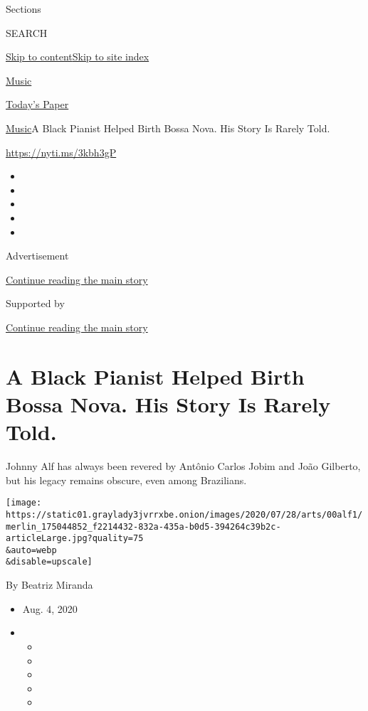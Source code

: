 Sections

SEARCH

\protect\hyperlink{site-content}{Skip to
content}\protect\hyperlink{site-index}{Skip to site index}

\href{https://www.nytimes3xbfgragh.onion/section/arts/music}{Music}

\href{https://myaccount.nytimes3xbfgragh.onion/auth/login?response_type=cookie\&client_id=vi}{}

\href{https://www.nytimes3xbfgragh.onion/section/todayspaper}{Today's
Paper}

\href{/section/arts/music}{Music}\textbar{}A Black Pianist Helped Birth
Bossa Nova. His Story Is Rarely Told.

\url{https://nyti.ms/3kbh3gP}

\begin{itemize}
\item
\item
\item
\item
\item
\end{itemize}

Advertisement

\protect\hyperlink{after-top}{Continue reading the main story}

Supported by

\protect\hyperlink{after-sponsor}{Continue reading the main story}

\hypertarget{a-black-pianist-helped-birth-bossa-nova-his-story-is-rarely-told}{%
\section{A Black Pianist Helped Birth Bossa Nova. His Story Is Rarely
Told.}\label{a-black-pianist-helped-birth-bossa-nova-his-story-is-rarely-told}}

Johnny Alf has always been revered by Antônio Carlos Jobim and João
Gilberto, but his legacy remains obscure, even among Brazilians.

\texttt{[image: https://static01.graylady3jvrrxbe.onion/images/2020/07/28/arts/00alf1/merlin\_175044852\_f2214432-832a-435a-b0d5-394264c39b2c-articleLarge.jpg?quality=75\\\&auto=webp\\\&disable=upscale]}

By Beatriz Miranda

\begin{itemize}
\item
  Aug. 4, 2020
\item
  \begin{itemize}
  \item
  \item
  \item
  \item
  \item
  \end{itemize}
\end{itemize}

